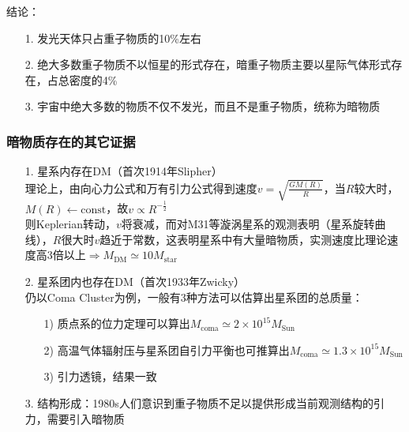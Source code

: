 \par 
结论：
\begin{itemize}
	\item[1. ] 发光天体只占重子物质的10\%左右
	\item[2. ] 绝大多数重子物质不以恒星的形式存在，暗重子物质主要以星际气体形式存在，占总密度的4\%
	\item[3. ] 宇宙中绝大多数的物质不仅不发光，而且不是重子物质，统称为暗物质
\end{itemize}

\subsubsection{暗物质存在的其它证据}
\begin{itemize}
	\item[1. ] 星系内存在DM（首次1914年Slipher） \\
	理论上，由向心力公式和万有引力公式得到速度$v = \sqrt{\frac{G M(R)}{R}}$，当$R$较大时，$M(R) \leftarrow \text{const}$，故$v \propto R^{- \frac{1}{2}}$ \\
	则Keplerian转动，$v$将衰减，而对M31等漩涡星系的观测表明（星系旋转曲线），$R$很大时$v$趋近于常数，这表明星系中有大量暗物质，实测速度比理论速度高3倍以上$\Rightarrow M_{\text{DM}} \simeq 10 M_{\text{star}}$
	
	\item[2. ] 星系团内也存在DM（首次1933年Zwicky） \\
	仍以Coma Cluster为例，一般有3种方法可以估算出星系团的总质量：
	\begin{itemize}
		\item[1)] 质点系的位力定理可以算出$M_{\text{coma}} \simeq 2 \times 10^{15} M_{\text{Sun}}$
		\item[2)] 高温气体辐射压与星系团自引力平衡也可推算出$M_{\text{coma}} \simeq 1.3 \times 10^{15} M_{\text{Sun}}$
		\item[3)] 引力透镜，结果一致
	\end{itemize}

	\item[3. ] 结构形成：1980s人们意识到重子物质不足以提供形成当前观测结构的引力，需要引入暗物质
\end{itemize}

